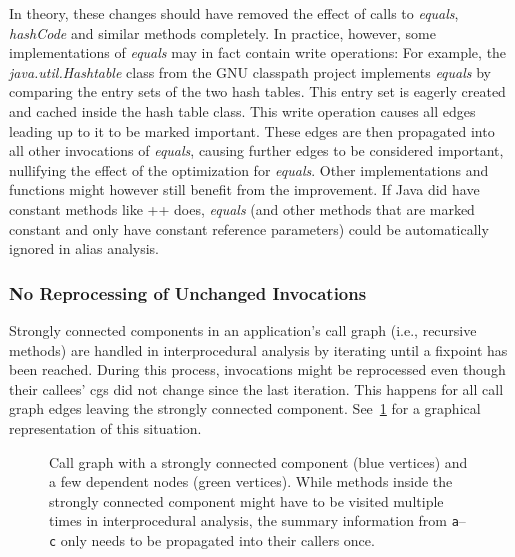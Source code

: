 				In theory, these changes should have removed the effect of calls to \emph{equals}, \emph{hashCode} and similar
				methods completely. In practice, however, some implementations of \emph{equals} may in fact contain write
				operations: For example, the \emph{java.util.Hashtable} class from the GNU classpath project implements
				\emph{equals} by comparing the entry sets of the two hash tables. This entry set is eagerly created and cached
				inside the hash table class. This write operation causes all edges leading up to it to be marked important.
				These edges are then propagated into all other invocations of \emph{equals}, causing further edges to be
				considered important, nullifying the effect of the optimization for \emph{equals}. Other implementations and
				functions might however still benefit from the improvement. If Java did have constant methods like \C++{} does,
				\emph{equals} (and other methods that are marked constant and only have constant reference parameters) could be
				automatically ignored in alias analysis.

			\subsubsection{No Reprocessing of Unchanged Invocations}
				\label{subsub:ea:improve:opt:quick-fixpoint}
				Strongly connected components in an application's call graph (i.e., recursive methods) are handled in
				interprocedural analysis by iterating until a fixpoint has been reached. During this process, invocations might
				be reprocessed even though their callees' \glspl{cg} did not change since the last iteration. This happens for
				all call graph edges leaving the strongly connected component. See~\cref{fig:ea:improve:quick-fixpoint} for
				a graphical representation of this situation.

				\begin{figure}
					\centering%

					\caption[Example call graph where avoiding reprocessing saves time]{%
						Call graph with a strongly connected component (blue {\color{cgblue}\blacksquare} vertices) and a few
						dependent nodes (green {\color{cggreen}\blacksquare} vertices). While methods inside the strongly connected
						component might have to be visited multiple times in interprocedural analysis, the summary information from
						\texttt{a}–\texttt{c} only needs to be propagated into their callers once.}%
					\label{fig:ea:improve:quick-fixpoint}%
				\end{figure}

